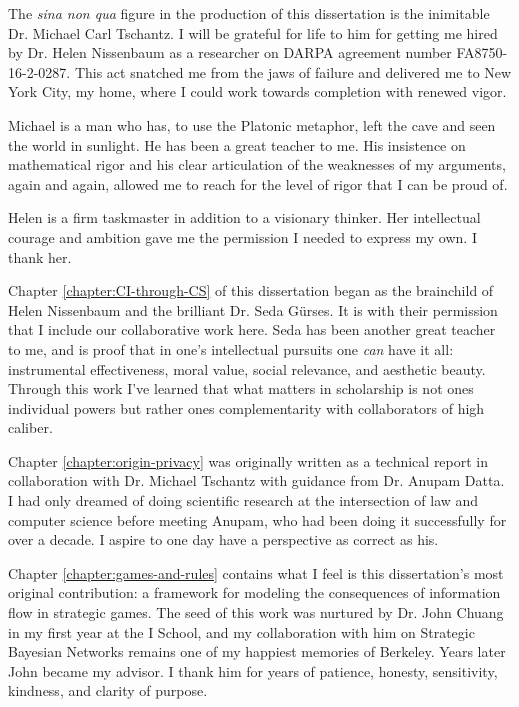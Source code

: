 \documentclass[../thesis.tex]{subfiles}
\begin{document}
 The \textit{sina non qua} figure in the production of this dissertation is the inimitable Dr. Michael Carl Tschantz.
 I will be grateful for life to him for getting me hired by Dr. Helen Nissenbaum as a researcher on DARPA agreement number FA8750-16-2-0287.
 This act snatched me from the jaws of failure and delivered me to New York City, my home, where I could work towards completion with renewed vigor.

 Michael is a man who has, to use the Platonic metaphor,
 left the cave and seen the world in sunlight.
 He has been a great teacher to me.
 His insistence on mathematical rigor and his clear
 articulation of the weaknesses of my arguments, again and again,
 allowed me to reach for the level of rigor
 that I can be proud of.

 Helen is a firm taskmaster in addition to a visionary thinker.
 Her intellectual courage and ambition gave me the permission I needed to express my own.
 I thank her.
 
 Chapter \ref{chapter:CI-through-CS} of this dissertation began as the brainchild of Helen Nissenbaum and the brilliant Dr. Seda G{\"u}rses.
 It is with their permission that I include our collaborative work here.
 Seda has been another great teacher to me,
 and is proof that in one's intellectual pursuits
 one \textit{can} have it all:
 instrumental effectiveness, moral value, social relevance,
 and aesthetic beauty.
 Through this work I've learned that what matters in
 scholarship is not ones individual powers but rather
 ones complementarity with collaborators of high caliber.

 Chapter \ref{chapter:origin-privacy} was originally written
 as a technical report in collaboration with Dr. Michael Tschantz
 with guidance from Dr. Anupam Datta.
 I had only dreamed of
 doing scientific research at the intersection of law
 and computer science before meeting Anupam,
 who had been doing it successfully for over a decade.
 I aspire to one day have a perspective as correct as his.

 Chapter \ref{chapter:games-and-rules} contains what I feel
 is this dissertation's most original contribution:
 a framework for modeling the consequences of information flow
 in strategic games.
 The seed of this work was nurtured by Dr. John Chuang
 in my first year at the I School, and my collaboration
 with him on Strategic Bayesian Networks remains one of
 my happiest memories of Berkeley.
 Years later John became my advisor.
 I thank him for years of patience, honesty, sensitivity,
 kindness, and clarity of purpose.
\end{document}
